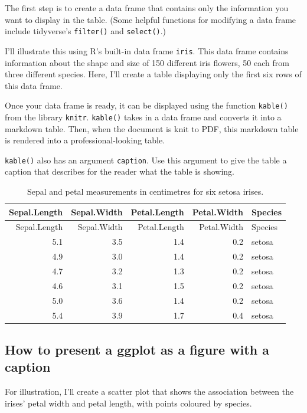\documentclass[
]{article}
\begin{document}
The first step is to create a data frame that contains only the
information you want to display in the table. (Some helpful functions
for modifying a data frame include tidyverse's \texttt{filter()} and
\texttt{select()}.)

I'll illustrate this using R's built-in data frame \texttt{iris}. This
data frame contains information about the shape and size of 150
different iris flowers, 50 each from three different species. Here, I'll
create a table displaying only the first six rows of this data frame.

Once your data frame is ready, it can be displayed using the function
\texttt{kable()} from the library \texttt{knitr}. \texttt{kable()} takes
in a data frame and converts it into a markdown table. Then, when the
document is knit to PDF, this markdown table is rendered into a
professional-looking table.

\texttt{kable()} also has an argument \texttt{caption}. Use this
argument to give the table a caption that describes for the reader what
the table is showing.

\begin{longtable}[]{@{}rrrrl@{}}
\caption{Sepal and petal measurements in centimetres for six setosa
irises.}\tabularnewline
\toprule()
Sepal.Length & Sepal.Width & Petal.Length & Petal.Width & Species \\
\midrule()
\endfirsthead
\toprule()
Sepal.Length & Sepal.Width & Petal.Length & Petal.Width & Species \\
\midrule()
\endhead
5.1 & 3.5 & 1.4 & 0.2 & setosa \\
4.9 & 3.0 & 1.4 & 0.2 & setosa \\
4.7 & 3.2 & 1.3 & 0.2 & setosa \\
4.6 & 3.1 & 1.5 & 0.2 & setosa \\
5.0 & 3.6 & 1.4 & 0.2 & setosa \\
5.4 & 3.9 & 1.7 & 0.4 & setosa \\
\bottomrule()
\end{longtable}

\hypertarget{how-to-present-a-ggplot-as-a-figure-with-a-caption}{%
\subsection{How to present a ggplot as a figure with a
caption}\label{how-to-present-a-ggplot-as-a-figure-with-a-caption}}

For illustration, I'll create a scatter plot that shows the association
between the irises' petal width and petal length, with points coloured
by species.
\end{document}
